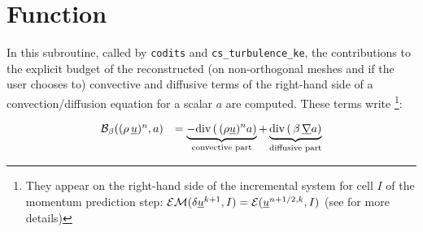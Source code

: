 
%
%
%
%



\hypertarget{bilsc2}{}

\vspace{1cm}
\section*{Function}

In this subroutine, called by \texttt{codits} and \texttt{cs\_turbulence\_ke}, the
contributions to the explicit budget of the reconstructed (on
non-orthogonal meshes and if the user chooses to) convective and
diffusive terms of the right-hand side of a convection/diffusion
equation for a scalar $a$ are computed. These terms
write \footnote{They appear on the right-hand side of the incremental
system for cell $I$ of the momentum prediction step:
$\mathcal{EM}(\delta\underline{u}^{k+1},I) =
\mathcal{E}(\underline{u}^{n+1/2,k},I)$  (see  for more details)}:

\begin{equation}\label{Base_Bilsc2_eq_continue}
\begin{array}{ll}
\mathcal{B_{\mathcal{\beta}}}((\rho\,\underline{u})^{n},a)
&=\underbrace{-\text{div}\,(\,(\rho \underline{u})^{n}a)}_{\text {convective part}}
+\underbrace{\text{div}\,(\,\beta\,\underline{\nabla} a)}_{\text{diffusive part}}\\
\end{array}
\end{equation}

